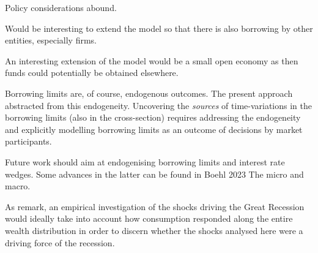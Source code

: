 \documentclass[12pt]{article} %
\numberwithin{equation}{section} %
\numberwithin{figure}{section}
\numberwithin{table}{section}
\begin{document}
Policy considerations abound.

Would be interesting to extend the model so  that there is also borrowing by other entities, especially firms.

An interesting extension of the model would be a small open economy as then funds could potentially be obtained elsewhere.

Borrowing limits are, of course, endogenous outcomes. The present approach abstracted from this endogeneity. Uncovering the \textit{sources} of time-variations in the borrowing limits (also in the cross-section) requires addressing the endogeneity and explicitly modelling borrowing limits as an outcome of decisions by market participants.

Future work should aim at endogenising borrowing limits and interest rate wedges. Some advances in the latter can be found in Boehl 2023 The micro and macro.

As \textcite{kv2018} remark, an empirical investigation of the shocks driving the  Great Recession would ideally take into account how consumption responded along the entire wealth distribution in order to discern whether the shocks analysed here were a driving force of the recession.

\newpage
\thispagestyle{plain}
\printbibliography[heading=bibintoc] %
\end{document}
